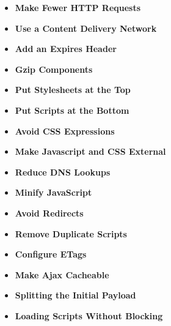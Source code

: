 \begin{itemize}
\item \textbf{Make Fewer HTTP Requests}



\item \textbf{Use a Content Delivery Network}



\item \textbf{Add an Expires Header}



\item \textbf{Gzip Components}



\item \textbf{Put Stylesheets at the Top}



\item \textbf{Put Scripts at the Bottom}



\item \textbf{Avoid CSS Expressions}



\item \textbf{Make Javascript and CSS External}



\item \textbf{Reduce DNS Lookups}



\item \textbf{Minify JavaScript}



\item \textbf{Avoid Redirects}



\item \textbf{Remove Duplicate Scripts}



\item \textbf{Configure ETags}



\item \textbf{Make Ajax Cacheable}



\item \textbf{Splitting the Initial Payload}



\item \textbf{Loading Scripts Without Blocking}




\end{itemize}

